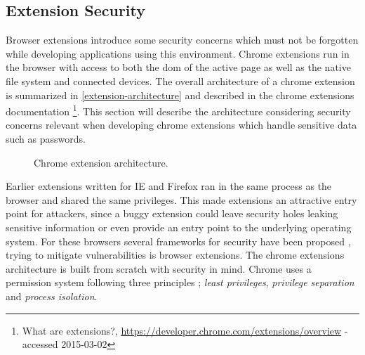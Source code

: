 \subsection{Extension Security}\label{extension-sec}
\par Browser extensions introduce some security concerns which must not be forgotten while developing applications using this environment. Chrome extensions run in the browser with access to both the \gls{dom} of the active page as well as the native file system and connected devices. The overall architecture of a chrome extension is summarized in \autoref{extension-architecture} and described in the chrome extensions documentation \footnote{What are extensions?, \url{https://developer.chrome.com/extensions/overview} - accessed 2015-03-02}. This section will describe the architecture considering security concerns relevant when developing chrome extensions which handle sensitive data such as passwords.



\begin{figure}[h]
    \caption{Chrome extension architecture.}
    \label{extension-architecture}
\end{figure}

\par Earlier extensions written for IE and Firefox ran in the same process as the browser and shared the same privileges. This made extensions an attractive entry point for attackers, since a buggy extension could leave security holes leaking sensitive information or even provide an entry point to the underlying operating system. For these browsers several frameworks for security have been proposed \cite{firefox-ie, js-info-flow}, trying to mitigate vulnerabilities is browser extensions. The chrome extensions architecture is built from scratch with security in mind. Chrome uses a permission system following three principles \cite{liu-chrome}; \emph{least privileges}, \emph{privilege separation} and \emph{process isolation}. 

